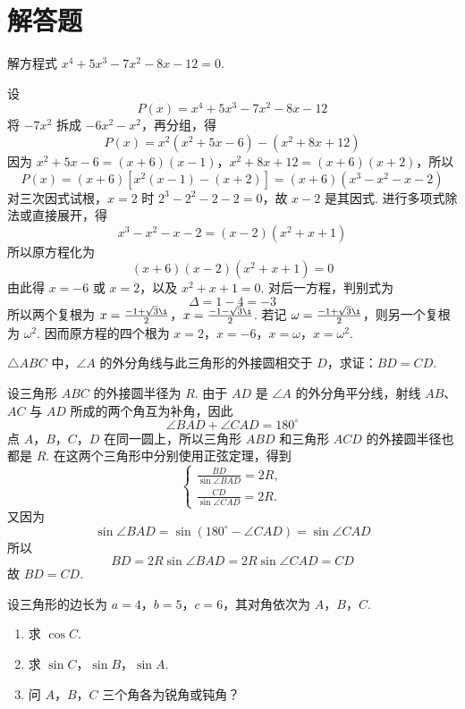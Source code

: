 \section{解答题}


\begin{problem}
解方程式 \(x^{4} + 5x^{3} - 7x^{2} - 8x - 12 = 0\).
\end{problem}

\begin{solution}
设
\[
P(x)=x^{4}+5x^{3}-7x^{2}-8x-12
\]
将 \(-7x^{2}\) 拆成 \(-6x^{2}-x^{2}\)，再分组，得
\[
P(x)=x^{2}\left(x^{2}+5x-6\right)-\left(x^{2}+8x+12\right)
\]
因为 \(x^{2}+5x-6=(x+6)(x-1)\)，\(x^{2}+8x+12=(x+6)(x+2)\)，所以
\[
P(x)=(x+6)\left[x^{2}(x-1)-(x+2)\right]
=(x+6)\left(x^{3}-x^{2}-x-2\right)
\]
对三次因式试根，\(x=2\) 时 \(2^{3}-2^{2}-2-2=0\)，故 \(x-2\) 是其因式. 进行多项式除法或直接展开，得
\[
x^{3}-x^{2}-x-2=(x-2)\left(x^{2}+x+1\right)
\]
所以原方程化为
\[
(x+6)(x-2)(x^{2}+x+1)=0
\]
由此得 \(x=-6\) 或 \(x=2\)，以及 \(x^{2}+x+1=0\). 对后一方程，判别式为
\[
\Delta=1-4=-3
\]
所以两个复根为
\(x=\frac{-1+\sqrt{3}\i}{2}\)，\(x=\frac{-1-\sqrt{3}\i}{2}\).
若记 \(\omega=\frac{-1+\sqrt{3}\i}{2}\)，则另一个复根为 \(\omega^{2}\). 因而原方程的四个根为
\(x=2\)，\(x=-6\)，\(x=\omega\)，\(x=\omega^{2}\).
\end{solution}

\begin{problem}
\(\triangle ABC\) 中，\(\angle A\) 的外分角线与此三角形的外接圆相交于 \(D\)，求证：\(BD = CD\).
\end{problem}

\begin{solution}
设三角形 \(ABC\) 的外接圆半径为 \(R\). 由于 \(AD\) 是 \(\angle A\) 的外分角平分线，射线 \(AB\)、\(AC\) 与 \(AD\) 所成的两个角互为补角，因此
\[
\angle BAD+\angle CAD=180^{\circ}
\]
点 \(A\)，\(B\)，\(C\)，\(D\) 在同一圆上，所以三角形 \(ABD\) 和三角形 \(ACD\) 的外接圆半径也都是 \(R\). 在这两个三角形中分别使用正弦定理，得到
\[
\begin{cases}
\frac{BD}{\sin\angle BAD}=2R,\\
\frac{CD}{\sin\angle CAD}=2R.
\end{cases}
\]
又因为
\[
\sin\angle BAD=\sin\left(180^{\circ}-\angle CAD\right)=\sin\angle CAD
\]
所以
\[
BD=2R\sin\angle BAD=2R\sin\angle CAD=CD
\]
故 \(BD=CD\).
\end{solution}

\begin{problem}
设三角形的边长为 \(a = 4\)，\(b = 5\)，\(c = 6\)，其对角依次为 \(A\)，\(B\)，\(C\).

\begin{enumerate}
    \item 求 \(\cos C\).
    \item 求 \(\sin C\)，\(\sin B\)，\(\sin A\).
    \item 问 \(A\)，\(B\)，\(C\) 三个角各为锐角或钝角？
\end{enumerate}
\end{problem}

